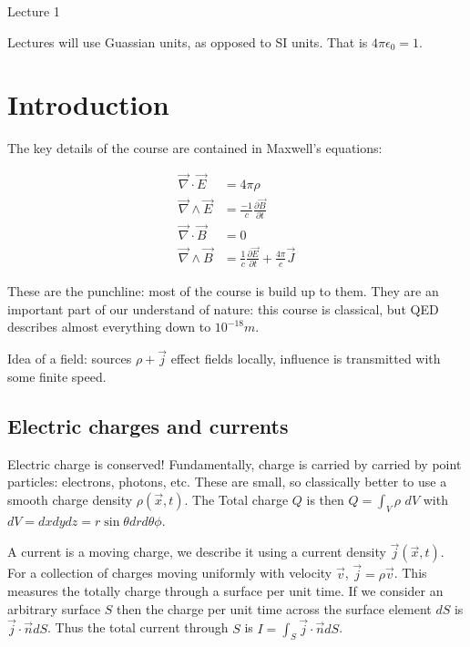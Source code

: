 \begin{center}

Lecture 1

\end{center}

Lectures will use Guassian units, as opposed to SI units. That is $4 \pi \epsilon_0 = 1$.

\section*{Introduction}

The key details of the course are contained in Maxwell's equations:

\begin{align*}

\vec{\nabla} \cdot \vec{E} &= 4 \pi \rho \\
\vec{\nabla} \wedge \vec{E} &= \frac{-1}{c} \frac{\partial \vec{B}}{\partial t} \\
\vec{\nabla} \cdot \vec{B} &= 0 \\
\vec{\nabla} \wedge \vec{B} &= \frac{1}{c} \frac{\partial \vec{E}}{\partial t} + \frac{4 \pi}{c} \vec{J}

\end{align*}


These are the punchline: most of the course is build up to them. They are an important part of our understand of nature: this course is classical, but QED describes almost everything down to $10^{-18} m$.

Idea of a field: sources $\rho + \vec{j}$ effect fields locally, influence is transmitted with some finite speed.

\subsection*{Electric charges and currents}

Electric charge is conserved! Fundamentally, charge is carried by carried by point particles: electrons, photons, etc. These are small, so classically better to use a smooth charge density $\rho (\vec{x}, t)$. The Total charge $Q$ is then $Q = \int_V \rho \,\, dV$ with $dV = dx dy dz = r \sin \theta dr d\theta \phi$.

A current is a moving charge, we describe it using a current density $\vec{j} (\vec{x}, t)$. For a collection of charges moving uniformly with velocity $\vec{v}$, $\vec{j} = \rho \vec{v}$. This measures the totally charge through a surface per unit time. If we consider an arbitrary surface $S$ then the charge per unit time across the surface element $dS$ is $\vec{j} \cdot \vec{n} dS$. Thus the total current through $S$ is $I = \int_S \vec{j} \cdot \vec{n} dS$. 

